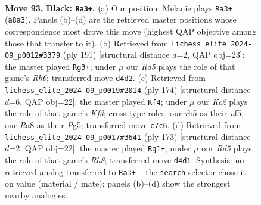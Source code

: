 \documentclass[11pt]{article}
\begin{document}
\clearpage

\begin{figure}[p]\centering
\begin{subfigure}{0.46\textwidth}\centering
\resizebox{\linewidth}{!}{%
\newchessgame
\chessboard[
  setfen={r7/2k5/8/1R6/3r3P/6K1/8/8 b - - 28 93},
  showmover=false,
  pgfstyle=straightmove, color=movearrow, markmove={a8-a3}
]}
\caption{}
\end{subfigure}\hfill
\begin{subfigure}{0.46\textwidth}\centering
\resizebox{\linewidth}{!}{%
\newchessgame
\chessboard[
  setfen={8/4k2P/6K1/8/8/7r/5R2/8 b - - 22 96},
  showmover=false,
  pgfstyle=straightmove, color=movearrow, markmove={h3-g3}
]}
\caption{}
\end{subfigure}
\\[4pt]
\begin{subfigure}{0.46\textwidth}\centering
\resizebox{\linewidth}{!}{%
\newchessgame
\chessboard[
  setfen={8/8/R7/5nP1/8/5K2/pk6/8 w - - 2 88},
  showmover=false,
  pgfstyle=straightmove, color=movearrow, markmove={f3-f4}
]}
\caption{}
\end{subfigure}\hfill
\begin{subfigure}{0.46\textwidth}\centering
\resizebox{\linewidth}{!}{%
\newchessgame
\chessboard[
  setfen={8/8/8/3k2KP/8/8/4R3/7r b - - 16 87},
  showmover=false,
  pgfstyle=straightmove, color=movearrow, markmove={h1-g1}
]}
\caption{}
\end{subfigure}
\caption{\textbf{Move 93, Black: \texttt{Ra3+}.} (a) Our position; Melanie plays \texttt{Ra3+} (\texttt{a8a3}). Panels (b)--(d) are the retrieved master positions whose correspondence most drove this move (highest QAP objective among those that transfer to it). (b) Retrieved from \texttt{lichess\_elite\_2024-09\_p0012\#3379} (ply 191) [structural distance $d$=2, QAP obj=23]: the master played \texttt{Rg3+}; under $\mu$ our \emph{Rd5} plays the role of that game's \emph{Rh6}; transferred move \texttt{d4d2}. (c) Retrieved from \texttt{lichess\_elite\_2024-09\_p0019\#2014} (ply 174) [structural distance $d$=6, QAP obj=22]: the master played \texttt{Kf4}; under $\mu$ our \emph{Kc2} plays the role of that game's \emph{Kf3}; cross-type roles: our \emph{r}b5 as their \emph{n}f5, our \emph{R}a8 as their \emph{P}g5; transferred move \texttt{c7c6}. (d) Retrieved from \texttt{lichess\_elite\_2024-09\_p0017\#3641} (ply 173) [structural distance $d$=2, QAP obj=22]: the master played \texttt{Rg1+}; under $\mu$ our \emph{Rd5} plays the role of that game's \emph{Rh8}; transferred move \texttt{d4d1}. Synthesis: no retrieved analog transferred to \texttt{Ra3+} -- the \texttt{search} selector chose it on value (material / mate); panels (b)--(d) show the strongest nearby analogies.}
\label{fig:thought-m185}
\end{figure}
\end{document}
